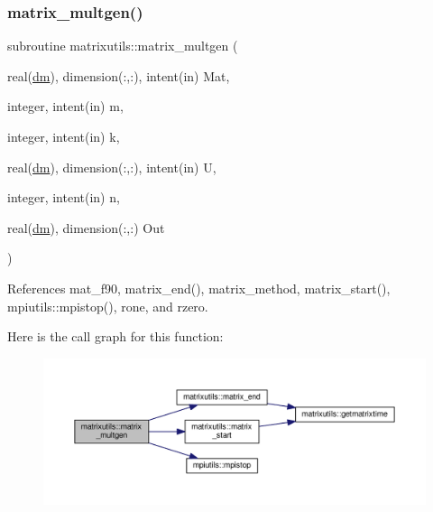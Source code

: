 \subsubsection{\texorpdfstring{matrix\+\_\+multgen()}{matrix\_multgen()}}
{\footnotesize\ttfamily subroutine matrixutils\+::matrix\+\_\+multgen (\begin{DoxyParamCaption}\item[{real(\mbox{\hyperlink{namespacematrixutils_a7bdc564986ea4d90f51201c75606ef3d}{dm}}), dimension(\+:,\+:), intent(in)}]{Mat,  }\item[{integer, intent(in)}]{m,  }\item[{integer, intent(in)}]{k,  }\item[{real(\mbox{\hyperlink{namespacematrixutils_a7bdc564986ea4d90f51201c75606ef3d}{dm}}), dimension(\+:,\+:), intent(in)}]{U,  }\item[{integer, intent(in)}]{n,  }\item[{real(\mbox{\hyperlink{namespacematrixutils_a7bdc564986ea4d90f51201c75606ef3d}{dm}}), dimension(\+:,\+:)}]{Out }\end{DoxyParamCaption})}



References mat\+\_\+f90, matrix\+\_\+end(), matrix\+\_\+method, matrix\+\_\+start(), mpiutils\+::mpistop(), rone, and rzero.

Here is the call graph for this function\+:
\nopagebreak
\begin{figure}[H]
\begin{center}
\leavevmode
\includegraphics[width=350pt]{namespacematrixutils_a6efcf6a348628fcb3694cb23761b52ec_cgraph}
\end{center}
\end{figure}
\mbox{\label{namespacematrixutils_a061be118f549334b7196808f5ce55245}} 
